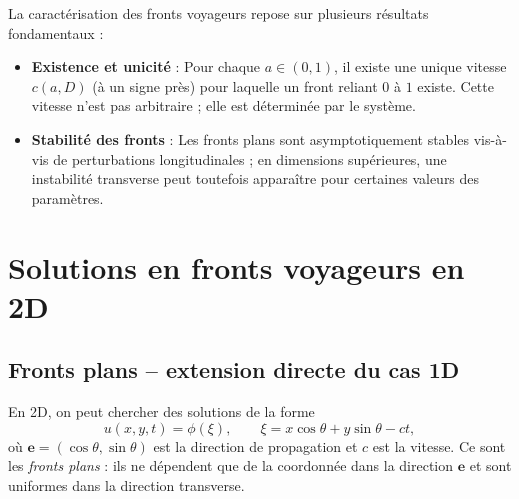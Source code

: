 \documentclass[11pt,a4paper]{report}
\begin{document}
La caractérisation des fronts voyageurs repose sur plusieurs résultats fondamentaux :
\begin{itemize}
  \item \textbf{Existence et unicité} : Pour chaque $a\in(0,1)$, il existe une unique vitesse $c(a,D)$ (à un signe près) pour laquelle un front reliant $0$ à $1$ existe. Cette vitesse n’est pas arbitraire ; elle est déterminée par le système.
 

      
  \item \textbf{Stabilité des fronts} : Les fronts plans sont asymptotiquement stables vis-à-vis de perturbations longitudinales ; en dimensions supérieures, une instabilité transverse peut toutefois apparaître pour certaines valeurs des paramètres.
\end{itemize}


\section{Solutions en fronts voyageurs en 2D}

\subsection*{Fronts plans -- extension directe du cas 1D}

En 2D, on peut chercher des solutions de la forme
\begin{equation}
  u(x,y,t) = \phi(\xi),\qquad \xi = x\cos\theta + y\sin\theta - ct,
\end{equation}
o\`u $\mathbf{e} = (\cos\theta, \sin\theta)$ est la direction de propagation et $c$ est
la vitesse. Ce sont les \emph{fronts plans} : ils ne d\'ependent que de la coordonn\'ee
dans la direction $\mathbf{e}$ et sont uniformes dans la direction transverse.
\end{document}
